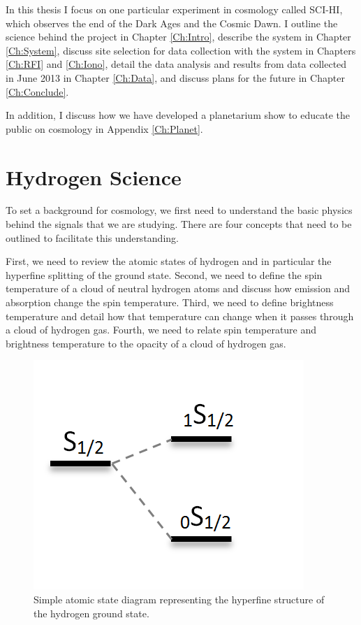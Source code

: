 In this thesis I focus on one particular experiment in \cm cosmology called SCI-HI, which observes the end of the Dark Ages and the Cosmic Dawn. I outline the science behind the project in Chapter \ref{Ch:Intro}, describe the system in Chapter \ref{Ch:System}, discuss site selection for data collection with the system in Chapters \ref{Ch:RFI} and \ref{Ch:Iono}, detail the data analysis and results from data collected in June 2013 in Chapter \ref{Ch:Data}, and discuss plans for the future in Chapter \ref{Ch:Conclude}. 

In addition, I discuss how we have developed a planetarium show to educate the public on \cm cosmology in Appendix \ref{Ch:Planet}. 

\section{Hydrogen \cm Science}
To set a background for \cm cosmology, we first need to understand the basic physics behind the signals that we are studying. There are four concepts that need to be outlined to facilitate this understanding. 

First, we need to review the atomic states of hydrogen and in particular the \cm hyperfine splitting of the ground state. Second, we need to define the spin temperature of a cloud of neutral hydrogen atoms and discuss how emission and absorption change the spin temperature. Third, we need to define brightness temperature and detail how that temperature can change when it passes through a cloud of hydrogen gas. Fourth, we need to relate spin temperature and brightness temperature to the opacity of a cloud of hydrogen gas. 

\begin{figure}[htb]
\begin{center}
\includegraphics[width=0.95\linewidth]{Introduction/figures/1s_spin_states.png}
\caption{Simple atomic state diagram representing the hyperfine structure of the hydrogen ground state.}
\label{Fig:spin_states}
\end{center}
\end{figure}

